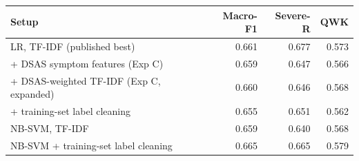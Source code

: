 \begin{tabular}{lrrr}
\toprule
Setup & Macro-F1 & Severe-R & QWK \\
\midrule
LR, TF-IDF (published best) & 0.661 & 0.677 & 0.573 \\
+ DSAS symptom features (Exp C) & 0.659 & 0.647 & 0.566 \\
+ DSAS-weighted TF-IDF (Exp C, expanded) & 0.660 & 0.646 & 0.568 \\
+ training-set label cleaning & 0.655 & 0.651 & 0.562 \\
NB-SVM, TF-IDF & 0.659 & 0.640 & 0.568 \\
NB-SVM + training-set label cleaning & 0.665 & 0.665 & 0.579 \\
\bottomrule
\end{tabular}%
